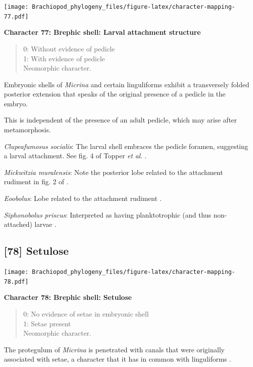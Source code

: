 \documentclass[]{book}
\theoremstyle{definition}
\theoremstyle{definition}
\theoremstyle{definition}
\theoremstyle{remark}
\begin{document}
\texttt{[image: Brachiopod\_phylogeny\_files/figure-latex/character-mapping-77.pdf]}

\textbf{Character 77: Brephic shell: Larval attachment structure}

\begin{quote}
0: Without evidence of pedicle\\
1: With evidence of pedicle\\
Neomorphic character.
\end{quote}

Embryonic shells of \emph{Micrina} and certain linguliforms exhibit a
transversely folded posterior extension that speaks of the original
presence of a pedicle in the embryo.

This is independent of the presence of an adult pedicle, which may arise
after metamorphosis.

\emph{Clupeafumosus socialis}: The larval shell embraces the pedicle
foramen, suggesting a larval attachment. See fig. 4 of Topper \emph{et
al}. \citeyearpar{Topper2013Reappraisalof}.

\emph{Mickwitzia muralensis}: Note the posterior lobe related to the
attachment rudiment in fig. 2 of \citet{Balthasar2009Thebrachiopod}.

\emph{Eoobolus}: Lobe related to the attachment rudiment \citep[fig.
2]{Balthasar2009Thebrachiopod}.

\emph{Siphonobolus priscus}: Interpreted as having planktotrophic (and
thus non-attached) larvae \citep{Popov2009Earlyontogeny}.

\hypertarget{setulose}{%
\subsection*{{[}78{]} Setulose}\label{setulose}}

\texttt{[image: Brachiopod\_phylogeny\_files/figure-latex/character-mapping-78.pdf]}

\textbf{Character 78: Brephic shell: Setulose}

\begin{quote}
0: No evidence of setae in embryonic shell\\
1: Setae present\\
Neomorphic character.
\end{quote}

The protegulum of \emph{Micrina} is penetrated with canals that were
originally associated with setae, a character that it has in common with
linguliforms \citep{Holmer2011Firstrecord}.
\end{document}
